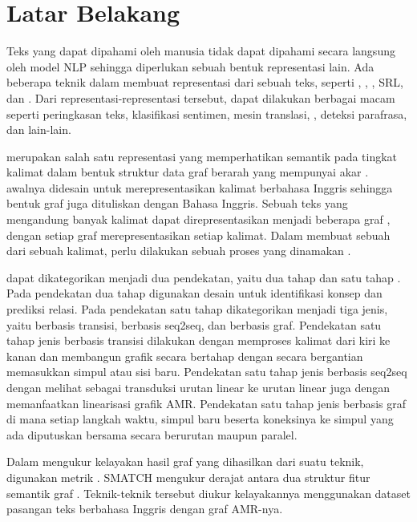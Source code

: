 \section{Latar Belakang}

Teks yang dapat dipahami oleh manusia tidak dapat dipahami secara langsung oleh model \gls{NLP} sehingga diperlukan sebuah bentuk representasi lain.
Ada beberapa teknik dalam membuat representasi dari sebuah teks, seperti , , , \gls{SRL}, dan \AMR{}.
Dari representasi-representasi tersebut, dapat dilakukan berbagai macam  seperti peringkasan teks, klasifikasi sentimen, mesin translasi, , deteksi parafrasa, dan lain-lain.

\AMR{} merupakan salah satu representasi yang memperhatikan semantik pada tingkat kalimat dalam bentuk struktur data graf berarah yang mempunyai akar .
\AMR{} awalnya didesain untuk merepresentasikan kalimat berbahasa Inggris sehingga bentuk graf \AMR{} juga dituliskan dengan Bahasa Inggris.
Sebuah teks yang mengandung banyak kalimat dapat direpresentasikan menjadi beberapa graf \AMR{}, dengan setiap graf merepresentasikan setiap kalimat.
Dalam membuat sebuah \AMR{} dari sebuah kalimat, perlu dilakukan sebuah proses yang dinamakan \amrparsing{}.

\amrparsing{} dapat dikategorikan menjadi dua pendekatan, yaitu dua tahap  dan satu tahap  .
Pada pendekatan dua tahap  digunakan desain  untuk identifikasi konsep dan prediksi relasi.
Pada pendekatan satu tahap  dikategorikan menjadi tiga jenis, yaitu  berbasis transisi,  berbasis \gls{seq2seq}, dan  berbasis graf.
Pendekatan satu tahap jenis  berbasis transisi dilakukan dengan memproses kalimat dari kiri ke kanan dan membangun grafik secara bertahap dengan secara bergantian memasukkan simpul atau sisi baru.
Pendekatan satu tahap jenis  berbasis \gls{seq2seq} dengan melihat  sebagai transduksi urutan linear ke urutan linear juga dengan memanfaatkan linearisasi grafik AMR.
Pendekatan satu tahap jenis  berbasis graf di mana setiap langkah waktu, simpul baru beserta koneksinya ke simpul yang ada diputuskan bersama secara berurutan maupun paralel.

Dalam mengukur kelayakan hasil graf \AMR{} yang dihasilkan dari suatu teknik, digunakan metrik \SMATCH{} .
SMATCH mengukur derajat  antara dua struktur fitur semantik graf \AMR{}.
Teknik-teknik \amrparsing{} tersebut diukur kelayakannya menggunakan dataset pasangan teks berbahasa Inggris dengan graf AMR-nya.

